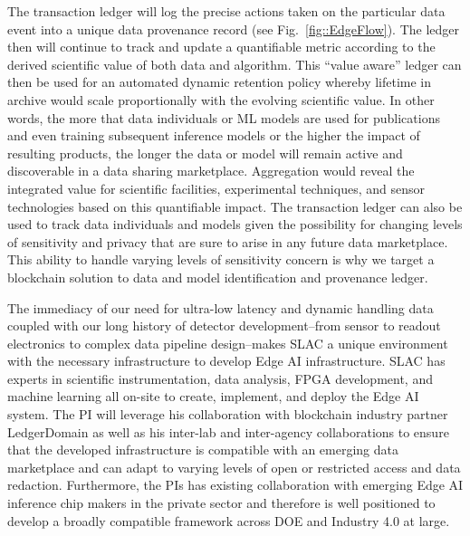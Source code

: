 \documentclass{article}
\begin{document}
The transaction ledger will log the precise actions taken on the particular data event into a unique data provenance record (see Fig.~\ref{fig::EdgeFlow}).
The ledger then will continue to track and update a quantifiable metric according to the derived scientific value of both data and algorithm.
This ``value aware'' ledger can then be used for an automated dynamic retention policy whereby lifetime in archive would scale proportionally with the evolving scientific value.
In other words, the more that data individuals or ML models are used for publications and even training subsequent inference models or the higher the impact of resulting products, the longer the data or model will remain active and discoverable in a data sharing marketplace. 
Aggregation would reveal the integrated value for scientific facilities, experimental techniques, and sensor technologies based on this quantifiable impact.
The transaction ledger can also be used to track data individuals and models given the possibility for changing levels of sensitivity and privacy that are sure to arise in any future data marketplace. 
This ability to handle varying levels of sensitivity concern is why we target a blockchain solution to data and model identification and provenance ledger.

The immediacy of our need for ultra-low latency and dynamic handling data coupled with our long history of detector development--from sensor to readout electronics to complex data pipeline design--makes SLAC a unique environment with the necessary infrastructure to develop Edge AI infrastructure.
SLAC has experts in scientific instrumentation, data analysis, FPGA development, and machine learning all on-site to create, implement, and deploy the Edge AI system.
The PI will leverage his collaboration with blockchain industry partner LedgerDomain \cite{LedgerDomain,BruinChain} as well as his inter-lab and inter-agency collaborations to ensure that the developed infrastructure is compatible with an emerging data marketplace and can adapt to varying levels of open or restricted access and data redaction.
Furthermore, the PIs has existing collaboration with emerging Edge AI inference chip makers in the private sector and therefore is well positioned to develop a broadly compatible framework across DOE and Industry 4.0 at large.
\end{document}
